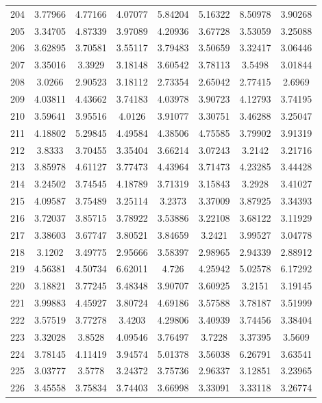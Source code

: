 \begin{center}
\begin{longtable}{cccccccc}
204 & 3.77966 & 4.77166 & 4.07077 & 5.84204 & 5.16322 & 8.50978 & 3.90268\\
205 & 3.34705 & 4.87339 & 3.97089 & 4.20936 & 3.67728 & 3.53059 & 3.25088\\
206 & 3.62895 & 3.70581 & 3.55117 & 3.79483 & 3.50659 & 3.32417 & 3.06446\\
207 & 3.35016 & 3.3929 & 3.18148 & 3.60542 & 3.78113 & 3.5498 & 3.01844\\
208 & 3.0266 & 2.90523 & 3.18112 & 2.73354 & 2.65042 & 2.77415 & 2.6969\\
209 & 4.03811 & 4.43662 & 3.74183 & 4.03978 & 3.90723 & 4.12793 & 3.74195\\
210 & 3.59641 & 3.95516 & 4.0126 & 3.91077 & 3.30751 & 3.46288 & 3.25047\\
211 & 4.18802 & 5.29845 & 4.49584 & 4.38506 & 4.75585 & 3.79902 & 3.91319\\
212 & 3.8333 & 3.70455 & 3.35404 & 3.66214 & 3.07243 & 3.2142 & 3.21716\\
213 & 3.85978 & 4.61127 & 3.77473 & 4.43964 & 3.71473 & 4.23285 & 3.44428\\
214 & 3.24502 & 3.74545 & 4.18789 & 3.71319 & 3.15843 & 3.2928 & 3.41027\\
215 & 4.09587 & 3.75489 & 3.25114 & 3.2373 & 3.37009 & 3.87925 & 3.34393\\
216 & 3.72037 & 3.85715 & 3.78922 & 3.53886 & 3.22108 & 3.68122 & 3.11929\\
217 & 3.38603 & 3.67747 & 3.80521 & 3.84659 & 3.2421 & 3.99527 & 3.04778\\
218 & 3.1202 & 3.49775 & 2.95666 & 3.58397 & 2.98965 & 2.94339 & 2.88912\\
219 & 4.56381 & 4.50734 & 6.62011 & 4.726 & 4.25942 & 5.02578 & 6.17292\\
220 & 3.18821 & 3.77245 & 3.48348 & 3.90707 & 3.60925 & 3.2151 & 3.19145\\
221 & 3.99883 & 4.45927 & 3.80724 & 4.69186 & 3.57588 & 3.78187 & 3.51999\\
222 & 3.57519 & 3.77278 & 3.4203 & 4.29806 & 3.40939 & 3.74456 & 3.38404\\
223 & 3.32028 & 3.8528 & 4.09546 & 3.76497 & 3.7228 & 3.37395 & 3.5609\\
224 & 3.78145 & 4.11419 & 3.94574 & 5.01378 & 3.56038 & 6.26791 & 3.63541\\
225 & 3.03777 & 3.5778 & 3.24372 & 3.75736 & 2.96337 & 3.12851 & 3.23965\\
226 & 3.45558 & 3.75834 & 3.74403 & 3.66998 & 3.33091 & 3.33118 & 3.26774\\

\end{longtable}
\end{center}
